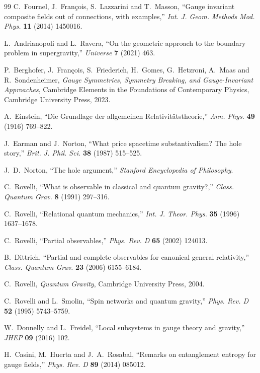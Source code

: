 \documentclass[11pt]{article}
\theoremstyle{plain}
\theoremstyle{definition}
\theoremstyle{remark}
\begin{document}
\begin{thebibliography}{99}
 C.~Fournel, J.~François, S.~Lazzarini and T.~Masson, ``Gauge invariant composite fields out of connections, with examples,'' \emph{Int. J. Geom. Methods Mod. Phys.} \textbf{11} (2014) 1450016.

 L.~Andrianopoli and L.~Ravera, ``On the geometric approach to the boundary problem in supergravity,'' \emph{Universe} \textbf{7} (2021) 463.

 P.~Berghofer, J.~François, S.~Friederich, H.~Gomes, G.~Hetzroni, A.~Maas and R.~Sondenheimer, \emph{Gauge Symmetries, Symmetry Breaking, and Gauge-Invariant Approaches}, Cambridge Elements in the Foundations of Contemporary Physics, Cambridge University Press, 2023.

 A.~Einstein, ``Die Grundlage der allgemeinen Relativitätstheorie,'' \emph{Ann. Phys.} \textbf{49} (1916) 769--822.

 J.~Earman and J.~Norton, ``What price spacetime substantivalism? The hole story,'' \emph{Brit. J. Phil. Sci.} \textbf{38} (1987) 515--525.

 J.~D.~Norton, ``The hole argument,'' \emph{Stanford Encyclopedia of Philosophy}.

 C.~Rovelli, ``What is observable in classical and quantum gravity?,'' \emph{Class. Quantum Grav.} \textbf{8} (1991) 297--316.

 C.~Rovelli, ``Relational quantum mechanics,'' \emph{Int. J. Theor. Phys.} \textbf{35} (1996) 1637--1678.

 C.~Rovelli, ``Partial observables,'' \emph{Phys. Rev. D} \textbf{65} (2002) 124013.

 B.~Dittrich, ``Partial and complete observables for canonical general relativity,'' \emph{Class. Quantum Grav.} \textbf{23} (2006) 6155--6184.

 C.~Rovelli, \emph{Quantum Gravity}, Cambridge University Press, 2004.

 C.~Rovelli and L.~Smolin, ``Spin networks and quantum gravity,'' \emph{Phys. Rev. D} \textbf{52} (1995) 5743--5759.

 W.~Donnelly and L.~Freidel, ``Local subsystems in gauge theory and gravity,'' \emph{JHEP} \textbf{09} (2016) 102.

 H.~Casini, M.~Huerta and J.~A.~Rosabal, ``Remarks on entanglement entropy for gauge fields,'' \emph{Phys. Rev. D} \textbf{89} (2014) 085012.


\end{thebibliography}
\end{document}
